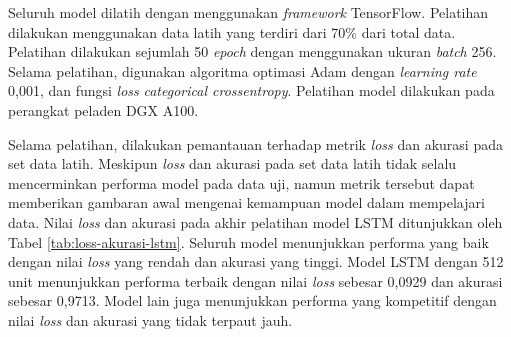 Seluruh model dilatih dengan menggunakan \textit{framework} TensorFlow. 
Pelatihan dilakukan menggunakan data latih yang terdiri dari 70\% dari total data.
Pelatihan dilakukan sejumlah 50 \textit{epoch} dengan menggunakan ukuran \textit{batch} 256.
Selama pelatihan, digunakan algoritma optimasi Adam dengan \textit{learning rate} 0,001, dan fungsi \textit{loss} \textit{categorical crossentropy}.
Pelatihan model dilakukan pada perangkat peladen DGX A100.


Selama pelatihan, dilakukan pemantauan terhadap metrik \textit{loss} dan akurasi pada set data latih.
Meskipun \textit{loss} dan akurasi pada set data latih tidak selalu mencerminkan performa model pada data uji, namun metrik tersebut dapat memberikan gambaran awal mengenai kemampuan model dalam mempelajari data.
Nilai \textit{loss} dan akurasi pada akhir pelatihan model LSTM ditunjukkan oleh Tabel \ref{tab:loss-akurasi-lstm}.
Seluruh model menunjukkan performa yang baik dengan nilai \textit{loss} yang rendah dan akurasi yang tinggi.
Model LSTM dengan 512 unit menunjukkan performa terbaik dengan nilai \textit{loss} sebesar 0,0929 dan akurasi sebesar 0,9713.
Model lain juga menunjukkan performa yang kompetitif dengan nilai \textit{loss} dan akurasi yang tidak terpaut jauh.

